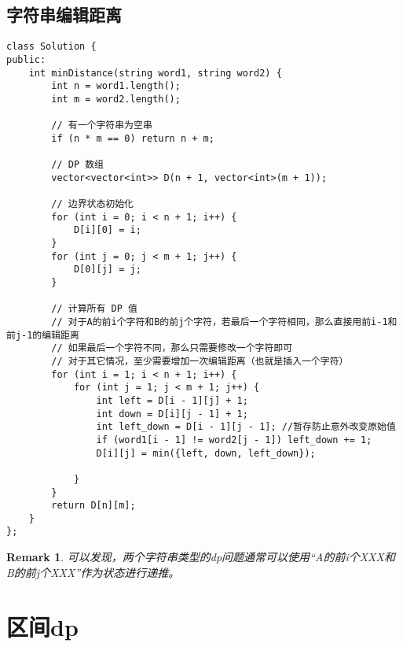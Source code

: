 \documentclass[12pt,a4paper,UTF16]{ctexbook}
\theoremstyle{plain}
\newtheorem{remark}{\indent Remark}[section]
\begin{document}
\subsection{字符串编辑距离}
\begin{lstlisting}
class Solution {
public:
    int minDistance(string word1, string word2) {
        int n = word1.length();
        int m = word2.length();

        // 有一个字符串为空串
        if (n * m == 0) return n + m;

        // DP 数组
        vector<vector<int>> D(n + 1, vector<int>(m + 1));

        // 边界状态初始化
        for (int i = 0; i < n + 1; i++) {
            D[i][0] = i;
        }
        for (int j = 0; j < m + 1; j++) {
            D[0][j] = j;
        }

        // 计算所有 DP 值
        // 对于A的前i个字符和B的前j个字符，若最后一个字符相同，那么直接用前i-1和前j-1的编辑距离
        // 如果最后一个字符不同，那么只需要修改一个字符即可
        // 对于其它情况，至少需要增加一次编辑距离（也就是插入一个字符）
        for (int i = 1; i < n + 1; i++) {
            for (int j = 1; j < m + 1; j++) {
                int left = D[i - 1][j] + 1;
                int down = D[i][j - 1] + 1;
                int left_down = D[i - 1][j - 1]; //暂存防止意外改变原始值
                if (word1[i - 1] != word2[j - 1]) left_down += 1;
                D[i][j] = min({left, down, left_down});

            }
        }
        return D[n][m];
    }
};
\end{lstlisting}
\begin{remark}
    可以发现，两个字符串类型的dp问题通常可以使用“A的前i个XXX和B的前j个XXX”作为状态进行递推。
\end{remark}


\section{区间dp}
\end{document}
